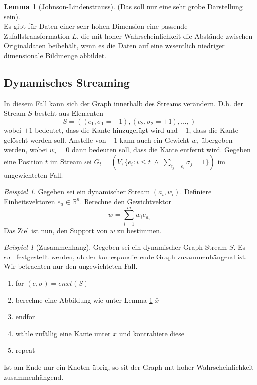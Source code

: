 \documentclass[a4paper, 12pt]{article}
\theoremstyle{plain}
\theoremstyle{definition}
\theoremstyle{lemma}
\newtheorem{lemma}[theorem]{Lemma}
\theoremstyle{remark}
\theoremstyle{corollary}
\theoremstyle{example}
\newtheorem{example}[theorem]{Beispiel}
\begin{document}
	\begin{lemma}[Johnson-Lindenstrauss]
		\label{lemma: JL}
		(Das soll nur eine sehr grobe Darstellung sein).\\
		Es gibt für Daten einer sehr hohen Dimension eine passende Zufallstransformation $L$, die mit hoher Wahrscheinlichkeit die Abstände zwischen Originaldaten beibehält, wenn es die Daten auf eine wesentlich niedriger dimensionale Bildmenge abbildet.
	\end{lemma}
	\subsection{Dynamisches Streaming}
	In diesem Fall kann sich der Graph innerhalb des Streams verändern. D.h. der Stream $S$ besteht aus Elementen \[S = ((e_1,\sigma_1 = \pm 1), (e_2,\sigma_2 =\pm 1), ..., )\]
	wobei $+1$ bedeutet, dass die Kante hinzugefügt wird und $-1$, dass die Kante gelöscht werden soll. Anstelle von $\pm1$ kann auch ein Gewicht $w_i$ übergeben werden, wobei $w_i = 0$ dann bedeuten soll, dass die Kante entfernt wird. Gegeben eine Position $t$ im Stream sei $G_t = (V, \{e_i: i\leq t \; \land \; \sum_{e_j=e_i} \sigma_j = 1\})$ im ungewichteten Fall.\\
	\begin{example}
		Gegeben sei ein dynamischer Stream $(a_i,w_i)$. Definiere Einheitsvektoren $e_a \in \mathbb{R}^n$. Berechne den Gewichtvektor \[w = \sum_{i=1}^{m} w_ie_{a_i}\]
		Das Ziel ist nun, den Support von $w$ zu bestimmen.
	\end{example}
	\begin{example}[Zusammenhang]
		Gegeben sei ein dynamischer Graph-Stream $S$. Es soll festgestellt werden, ob der korrespondierende Graph zusammenhängend ist. Wir betrachten nur den ungewichteten Fall. \begin{enumerate}
			\item for $(e,\sigma) = enxt(S)$
			\item berechne eine Abbildung wie unter Lemma \ref{lemma: JL} $\bar x$
			\item endfor
			\item wähle zufällig eine Kante unter $\bar x$ und kontrahiere diese
			\item repeat
		\end{enumerate}
		Ist am Ende nur ein Knoten übrig, so sit der Graph mit hoher Wahrscheinlichkeit zusammenhängend.
	\end{example}
\end{document}

